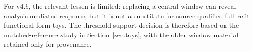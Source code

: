 For v4.9, the relevant lesson is limited: replacing a central window can reveal
analysis-mediated response, but it is not a substitute for source-qualified
full-refit functional-form toys.  The threshold-support decision is therefore based on
the matched-reference study in Section~\ref{sec:toys}, with the older window material
retained only for provenance.
